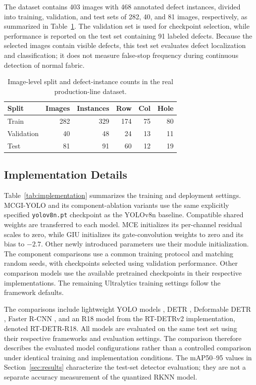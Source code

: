 \documentclass[journal]{IEEEtran}
\newcommand{\model}{MCGI-YOLO\xspace}
\begin{document}
The dataset contains 403 images with 468 annotated defect instances, divided into training, validation, and test sets of 282, 40, and 81 images, respectively, as summarized in Table~\ref{tab:data}. The validation set is used for checkpoint selection, while performance is reported on the test set containing 91 labeled defects. Because the selected images contain visible defects, this test set evaluates defect localization and classification; it does not measure false-stop frequency during continuous detection of normal fabric.
\begin{table}[!htbp]
\caption{Image-level split and defect-instance counts in the real production-line dataset.}
\label{tab:data}
\centering
\footnotesize
\begin{tabular}{lrrrrr}
\toprule
Split & Images & Instances & Row & Col & Hole \\
\midrule
Train & 282 & 329 & 174 & 75 & 80 \\
Validation & 40 & 48 & 24 & 13 & 11 \\
Test & 81 & 91 & 60 & 12 & 19 \\
\bottomrule
\end{tabular}
\end{table}

\subsection{Implementation Details}
\label{sec:implementation}
Table~\ref{tab:implementation} summarizes the training and deployment settings. \model and its component-ablation variants use the same explicitly specified \texttt{yolov8n.pt} checkpoint as the YOLOv8n baseline. Compatible shared weights are transferred to each model. MCE initializes its per-channel residual scales to zero, while GIU initializes its gate-convolution weights to zero and its bias to $-2.7$. Other newly introduced parameters use their module initialization. The component comparisons use a common training protocol and matching random seeds, with checkpoints selected using validation performance. Other comparison models use the available pretrained checkpoints in their respective implementations. The remaining Ultralytics training settings follow the framework defaults.

The comparisons include lightweight YOLO models \cite{ultralytics2023,tian2025yolov12}, DETR \cite{carion2020detr}, Deformable DETR \cite{zhu2021deformable}, Faster R-CNN \cite{ren2015faster}, and an R18 model from the RT-DETRv2 implementation, denoted RT-DETR-R18. All models are evaluated on the same test set using their respective frameworks and evaluation settings. The comparison therefore describes the evaluated model configurations rather than a controlled comparison under identical training and implementation conditions. The mAP50--95 values in Section~\ref{sec:results} characterize the test-set detector evaluation; they are not a separate accuracy measurement of the quantized RKNN model.
\end{document}
